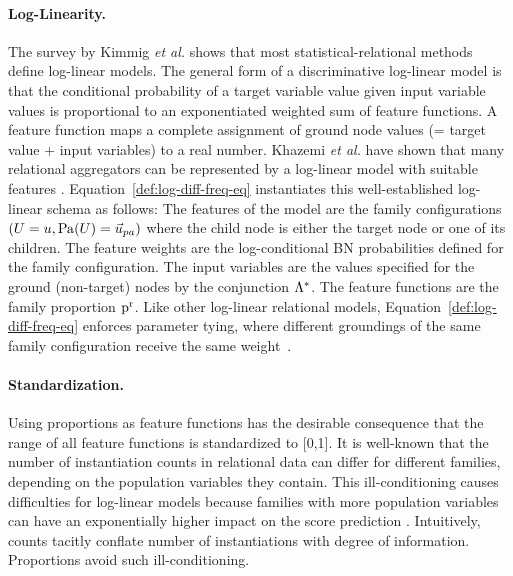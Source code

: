 \documentclass{sfuthesis}
\begin{document}
\paragraph{Log-Linearity.} The survey by Kimmig {\em et al.} \cite{Kimmig2015} shows that most statistical-relational methods define log-linear models. The general form of a discriminative log-linear model \cite{Sutton2007} is that the conditional probability of a target variable value given input variable values is proportional to an exponentiated weighted sum of feature functions. A feature function maps a complete assignment of ground node values (= target value + input variables) to a real number. Khazemi {\em et al.} have shown that many relational aggregators can be represented by a log-linear model with suitable features \cite{Kazemi2014}. 
Equation~\eqref{def:log-diff-freq-eq} instantiates this well-established log-linear schema as follows: The features of the model are the family configurations $(\Appendterm{\UT  = \UV} {\Pa{\UT} = \Prange{\UT}})$ 
where the child node is either the target node or one of its children. The feature weights are the log-conditional BN probabilities defined for the family configuration. The input variables are the values specified for the ground (non-target) nodes by the conjunction $\Lambda^{*}\hspace{0.0ex}$.
The feature functions are the family proportion $\mathrm{p}^{\mathrm{r}}$. Like other log-linear relational models, Equation~\ref{def:log-diff-freq-eq} enforces parameter tying, where different groundings of the same family configuration receive the same weight~\cite{Kimmig2015}. 

\paragraph{Standardization.} Using proportions as feature functions has the desirable consequence that the range of all feature functions is standardized to [0,1]. It is well-known that the number of instantiation counts in relational data can differ for different families, depending on the population variables they contain. This ill-conditioning causes difficulties for log-linear models because families with more population variables can have an exponentially higher impact on the score prediction \cite{Lowd2007}. Intuitively, counts tacitly conflate number of instantiations with degree of information. Proportions avoid such ill-conditioning.
\end{document}
